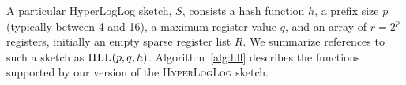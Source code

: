 \documentclass{vldb}
\newcommand{\algoname}[1]{\textnormal{\textsc{#1}}}
\begin{document}
 


A particular HyperLogLog sketch, $S$, consists a hash function $h$, a prefix size $p$ (typically between 4 and 16), a maximum register value $q$, and an array of $r=2^p$ registers, initially an empty sparse register list $R$. 
We summarize references to such a sketch as $\algoname{HLL}(p,q,h)$.
Algorithm~\ref{alg:hll} describes the functions supported by our version of the \algoname{HyperLogLog} sketch. 
\end{document}
